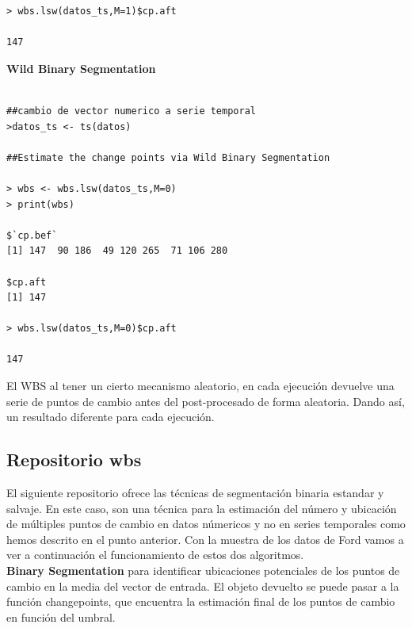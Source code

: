 \documentclass[runningheads,a4paper,12pt]{report}
\begin{document}
\begin{lstlisting}
> wbs.lsw(datos_ts,M=1)$cp.aft

147
\end{lstlisting}

\textbf{Wild Binary Segmentation}
\begin{lstlisting}

##cambio de vector numerico a serie temporal
>datos_ts <- ts(datos)

##Estimate the change points via Wild Binary Segmentation

> wbs <- wbs.lsw(datos_ts,M=0)
> print(wbs)

$`cp.bef`
[1] 147  90 186  49 120 265  71 106 280

$cp.aft
[1] 147

> wbs.lsw(datos_ts,M=0)$cp.aft

147
\end{lstlisting}

El WBS al tener un cierto mecanismo aleatorio, en cada ejecución devuelve una serie de puntos de cambio antes del post-procesado de forma aleatoria. Dando así, un resultado diferente para cada ejecución.
\newpage
\subsection{Repositorio wbs \cite{wbs}}
El siguiente repositorio ofrece las técnicas de segmentación binaria estandar y salvaje. En este caso, son una técnica para la estimación del número y ubicación de múltiples puntos de cambio en datos númericos y no en series temporales como hemos descrito en el punto anterior. Con la muestra de los datos de Ford vamos a ver a continuación el funcionamiento de estos dos algoritmos.\\

\textbf{Binary Segmentation} para identificar ubicaciones potenciales de los puntos de cambio en la media del vector de entrada. El objeto devuelto se puede pasar a la función changepoints, que encuentra la estimación final de los puntos de cambio en función del umbral.
\end{document}
